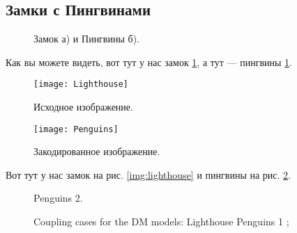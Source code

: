 \documentclass[a4paper,12pt]{report} %
\begin{document}
    \subsection{Замки с Пингвинами}
    \begin{figure}[h]
        \begin{minipage}[h]{0.49\linewidth}
        \end{minipage}
        \hfill
        \begin{minipage}[h]{0.49\linewidth}
        \end{minipage}
        \caption{Замок а) и Пингвины б).}
        \label{img:castle_penguins}
    \end{figure}
    Как вы можете видеть, вот тут у нас замок \ref{img:castle_penguins}, а тут — пингвины \ref{img:castle_penguins}.
    \begin{figure}[h]
        \begin{center}
            \begin{minipage}[h]{0.4\linewidth}
                \texttt{[image: Lighthouse]}
                \caption{Исходное изображение.} %
                \label{img:lighthouse} %
            \end{minipage}
            \hfill 
            \begin{minipage}[h]{0.4\linewidth}
                \texttt{[image: Penguins]}
                \caption{Закодированное изображение.}
                \label{img:penguins}
            \end{minipage}
        \end{center}
    \end{figure}
    Вот тут у нас замок на рис. \ref{img:lighthouse} и пингвины на рис. \ref{img:penguins}.
    \begin{figure}[ht!]
        \vspace{-4ex}
        \centering
        \hspace{4ex}
        \hspace{4ex}
        \caption{Coupling cases for the DM models: 
         Lighthouse
         Penguins 1 ; 
        } Penguins 2.
        \label{fig:threeDMcases}
    \end{figure}
\end{document}
